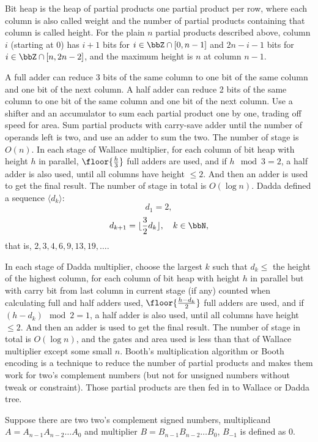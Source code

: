 \documentclass[a4paper,12pt]{report}
\begin{document}
Bit heap is the heap of partial products one partial product per row, where each column is also called weight and the number of partial products containing that column is called height. For the plain $n$ partial products described above, column $i$ (starting at 0) has $i+1$ bits for $i\in\bbZ\cap[0,n-1]$ and $2n-i-1$ bits for $i\in\bbZ\cap[n,2n-2]$, and the maximum height is $n$ at column $n-1$.

A full adder can reduce 3 bits of the same column to one bit of the same column and one bit of the next column. A half adder can reduce 2 bits of the same column to one bit of the same column and one bit of the next column.
Use a shifter and an accumulator to sum each partial product one by one, trading off speed for area.
Sum partial products with carry-save adder until the number of operands left is two, and use an adder to sum the two. The number of stage is $O(n)$.
In each stage of Wallace multiplier, for each column of bit heap with height $h$ in parallel, $\floor{\frac{h}{3}}$ full adders are used, and if $h\mod 3=2$, a half adder is also used, until all columns have height $\le 2$. And then an adder is used to get the final result. The number of stage in total is $O(\log n)$.
Dadda defined a sequence $\langle d_k\rangle$:
\[d_1=2,\]
\[d_{k+1}=\lfloor\frac{3}{2}d_k\rfloor,\quad k\in\bbN,\]
that is, $2,3,4,6,9,13,19,\ldots$.

In each stage of Dadda multiplier, choose the largest $k$ such that $d_k\le$ the height of the highest column, for each column of bit heap with height $h$ in parallel but with carry bit from last column in current stage (if any) counted when calculating full and half adders used, $\floor{\frac{h-d_k}{2}}$ full adders are used, and if $(h-d_k)\mod 2=1$, a half adder is also used, until all columns have height $\le 2$. And then an adder is used to get the final result. The number of stage in total is $O(\log n)$, and the gates and area used is less than that of Wallace multiplier except some small $n$.
Booth's multiplication algorithm or Booth encoding is a technique to reduce the number of partial products and makes them work for two's complement numbers (but not for unsigned numbers without tweak or constraint). Those partial products are then fed in to Wallace or Dadda tree. 

Suppose there are two two's complement signed numbers, multiplicand $A=A_{n-1}A_{n-2}\ldots A_0$ and multiplier $B=B_{n-1}B_{n-2}\ldots B_0$, $B_{-1}$ is defined as 0.
\end{document}
